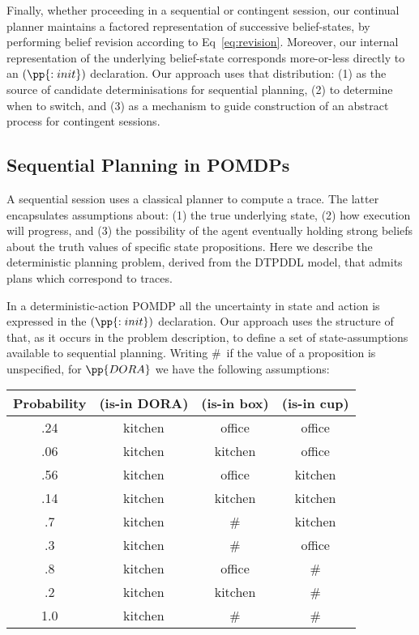 Finally, whether proceeding in a sequential or contingent session, our
continual planner maintains a factored representation of successive
belief-states, by performing belief revision according to
Eq~\ref{eq:revision}. Moreover, our internal representation of the
underlying belief-state corresponds more-or-less directly to an
$(\pp{:init})$ declaration. Our approach uses that distribution: (1)
as the source of candidate determinisations for sequential planning,
(2) to determine when to switch, and (3) as a mechanism to guide
construction of an abstract process for contingent sessions.



\subsection{Sequential Planning in POMDPs}

A sequential session uses a classical planner to compute a trace. The
latter encapsulates assumptions about: (1) the true underlying state,
(2) how execution will progress, and (3) the possibility of the agent
eventually holding strong beliefs about the truth values of specific
state propositions. Here we describe the deterministic planning
problem, derived from the DTPDDL model, that admits plans which
correspond to traces.

In a deterministic-action POMDP all the uncertainty in state and
action is expressed in the $(\pp{:init})$ declaration. Our approach
uses the structure of that, as it occurs in the problem description,
to define a set of state-assumptions available to sequential planning.
Writing \#\ if the value of a proposition is unspecified, for
$\pp{DORA}$ we have the following assumptions:

\small
\begin{tabular}{cccc}
\hline
Probability & (is-in DORA)  & (is-in box)  & (is-in cup) \\
\hline
.24 & kitchen & office & office \\
.06 & kitchen & kitchen & office \\
.56 & kitchen & office & kitchen \\
.14 & kitchen & kitchen & kitchen \\
.7 & kitchen & \# &  kitchen\\
.3 & kitchen & \# & office \\
.8 & kitchen & office & \# \\
.2 & kitchen & kitchen & \# \\
1.0 & kitchen & \# & \# \\
\hline
\end{tabular}
\normalsize

